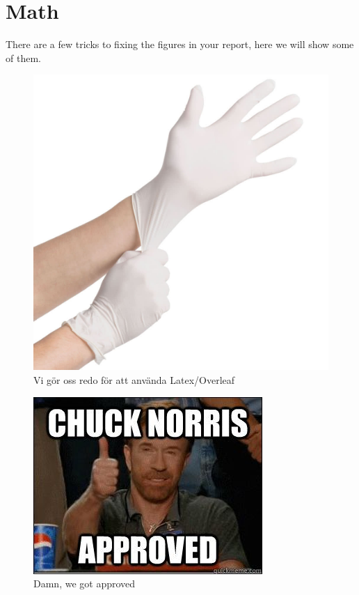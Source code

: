 \section{Math}
There are a few tricks to fixing the figures in your report, here we will show some of them.

\begin{figure}[H]
    \centering
    \includegraphics[scale= 0.3]{Images/Gloves.jpg}
    \caption{Vi gör oss redo för att använda Latex/Overleaf}
    \label{fig:latex}
\end{figure}


\begin{figure}[H]
    \centering
    \includegraphics{Images/Approved.jpg}
    \caption{Damn, we got approved \citep{einstein}}
    \label{fig:chuckychuck}
\end{figure}


